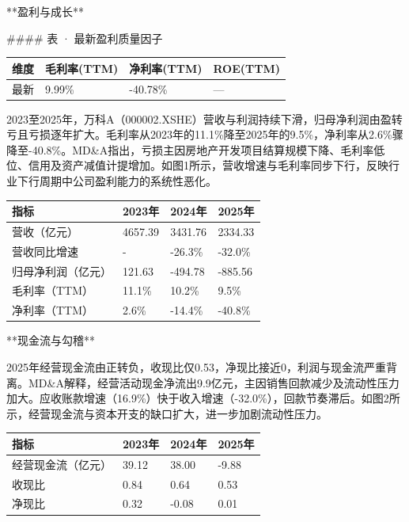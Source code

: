 \documentclass[12pt,a4paper]{article}
\begin{document}
**盈利与成长**

\#\#\#\# 表 · 最新盈利质量因子

\begin{table}[htbp]
\centering
\begin{tabular}{llll}
\toprule
维度 & 毛利率(TTM) & 净利率(TTM) & ROE(TTM) \\
\midrule
最新 & 9.99\% & -40.78\% & — \\
\bottomrule
\end{tabular}
\end{table}


2023至2025年，万科A（000002.XSHE）营收与利润持续下滑，归母净利润由盈转亏且亏损逐年扩大。毛利率从2023年的11.1\%降至2025年的9.5\%，净利率从2.6\%骤降至-40.8\%。MD\&A指出，亏损主因房地产开发项目结算规模下降、毛利率低位、信用及资产减值计提增加。如图1所示，营收增速与毛利率同步下行，反映行业下行周期中公司盈利能力的系统性恶化。

\begin{table}[htbp]
\centering
\begin{tabular}{llll}
\toprule
指标 & 2023年 & 2024年 & 2025年 \\
\midrule
营收（亿元） & 4657.39 & 3431.76 & 2334.33 \\
营收同比增速 & - & -26.3\% & -32.0\% \\
归母净利润（亿元） & 121.63 & -494.78 & -885.56 \\
毛利率（TTM） & 11.1\% & 10.2\% & 9.5\% \\
净利率（TTM） & 2.6\% & -14.4\% & -40.8\% \\
\bottomrule
\end{tabular}
\end{table}


**现金流与勾稽**

2025年经营现金流由正转负，收现比仅0.53，净现比接近0，利润与现金流严重背离。MD\&A解释，经营活动现金净流出9.9亿元，主因销售回款减少及流动性压力加大。应收账款增速（16.9\%）快于收入增速（-32.0\%），回款节奏滞后。如图2所示，经营现金流与资本开支的缺口扩大，进一步加剧流动性压力。

\begin{table}[htbp]
\centering
\begin{tabular}{llll}
\toprule
指标 & 2023年 & 2024年 & 2025年 \\
\midrule
经营现金流（亿元） & 39.12 & 38.00 & -9.88 \\
收现比 & 0.84 & 0.64 & 0.53 \\
净现比 & 0.32 & -0.08 & 0.01 \\
\bottomrule
\end{tabular}
\end{table}
\end{document}
